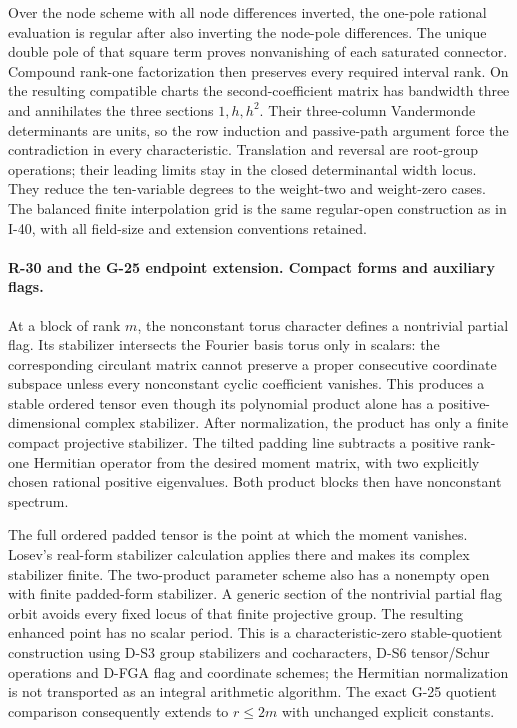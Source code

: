 Over the node scheme with all node differences inverted, the
one-pole rational evaluation is regular after also inverting
the node-pole differences. The unique double pole of that square
term proves nonvanishing of each saturated connector. Compound
rank-one factorization then preserves every required interval
rank. On the resulting compatible charts the second-coefficient
matrix has bandwidth three and annihilates the three sections
$1,h,h^2$. Their three-column Vandermonde determinants are units,
so the row induction and passive-path argument force the
contradiction in every characteristic. Translation and reversal
are root-group operations; their leading limits stay in the
closed determinantal width locus. They reduce the ten-variable
degrees to the weight-two and weight-zero cases. The balanced
finite interpolation grid is the same regular-open construction
as in I-40, with all field-size and extension conventions retained.


\paragraph{R-30 and the G-25 endpoint extension. Compact forms and auxiliary flags.}
At a block of rank $m$, the nonconstant torus character defines
a nontrivial partial flag. Its stabilizer intersects the Fourier
basis torus only in scalars: the corresponding circulant matrix
cannot preserve a proper consecutive coordinate subspace unless
every nonconstant cyclic coefficient vanishes. This produces a
stable ordered tensor even though its polynomial product alone
has a positive-dimensional complex stabilizer. After normalization,
the product has only a finite compact projective stabilizer.
The tilted padding line subtracts a positive rank-one Hermitian
operator from the desired moment matrix, with two explicitly
chosen rational positive eigenvalues. Both product blocks then
have nonconstant spectrum.

The full ordered padded tensor is the point at which the moment
vanishes. Losev's real-form stabilizer calculation applies there
and makes its complex stabilizer finite. The two-product parameter
scheme also has a nonempty open with finite padded-form stabilizer.
A generic section of the nontrivial partial flag orbit avoids
every fixed locus of that finite projective group. The resulting
enhanced point has no scalar period. This is a characteristic-zero
stable-quotient construction using D-S3 group stabilizers and
cocharacters, D-S6 tensor/Schur operations and D-FGA flag and
coordinate schemes; the Hermitian normalization is not transported
as an integral arithmetic algorithm. The exact G-25 quotient
comparison consequently extends to $r\le2m$ with unchanged
explicit constants.

